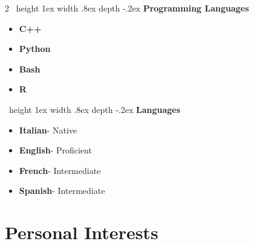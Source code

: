 \documentclass[10pt]{article} %
\makeatletter
\newcommand{\sqbulle}{~\vrule height 1ex width .8ex depth -.2ex} %
\newcommand{\titledate}[2][2.5in]{%
  \noindent%
  \begin{tabular}{@{}p{#1}@{}}
    \\ \hline \\[-.75\normalbaselineskip]
    Date
  \end{tabular}
  \begin{flushright}
  \begin{tabular}{@{}p{#1}@{}}
    \\ \hline \\[-.75\normalbaselineskip]
    #2
  \end{tabular} \hspace{1in}
  \end{flushright}
  }
\makeatother
\begin{document}
\begin{paracol}{2}
\sqbulle \hspace{2mm} \textbf{Programming Languages}\\
\begin{itemize}
\vspace{-6mm}
\item \textbf{C++}\\%
\vspace{-6mm}
\item \textbf{Python}\\%
\vspace{-6mm}
\item \textbf{Bash}\\%
\vspace{-6mm}
\item \textbf{R}\\%
\end{itemize}
\switchcolumn
\sqbulle \hspace{2mm} \textbf{Languages}
\begin{itemize}
\item \textbf{Italian}- Native \\
\vspace{-6mm}
\item\textbf{English}- Proficient \\
\vspace{-6mm}
\item\textbf{French}- Intermediate \\
\vspace{-6mm}
\item\textbf{Spanish}- Intermediate
\end{itemize}
\end{paracol}





\section{Personal Interests}





\end{document}
